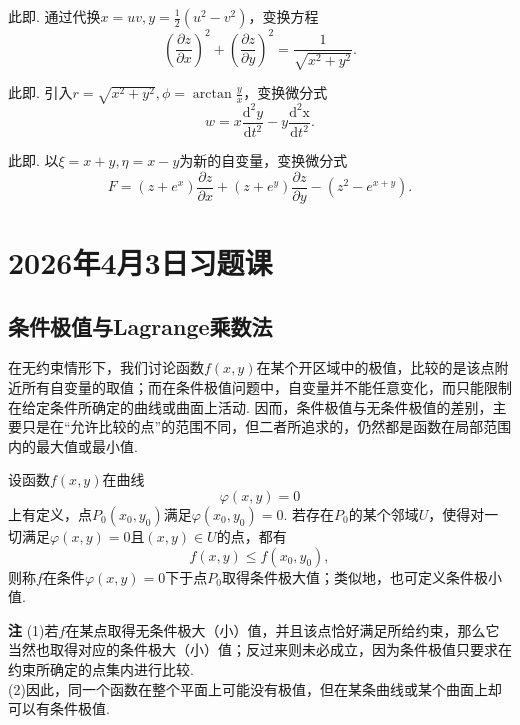 \documentclass{ctexart}
\newcounter{EnvironmentCounter}
\newcommand{\renewEnvironmentCounter}{\setcounter{EnvironmentCounter}{0}}
\newenvironment{custom}[1]{\par\noindent \textbf{#1}\quad}{\par\vspace{1em}}
\begin{document}
\begin{exercise}
此即\cite[例题20.3.2]{XHM}. 通过代换$x=uv,y=\frac{1}{2}(u^{2}-v^{2})$，变换方程
$$\left(\frac{\partial z}{\partial x}\right)^{2}+\left(\frac{\partial z}{\partial y}\right)^{2}=\frac{1}{\sqrt{x^{2}+y^{2}}}.$$
\end{exercise}

\begin{exercise}
此即\cite[20.3.3节练习题2]{XHM}. 引入$r=\sqrt{x^{2}+y^{2}},\phi=\arctan{\frac{y}{x}}$，变换微分式
$$w=x\frac{\mathrm{d}^{2}y}{\mathrm{d}t^{2}}-y\frac{\mathrm{d^{2}x}}{\mathrm{d}t^{2}}.$$
\end{exercise}

\begin{exercise}
此即\cite[20.3.3节练习题3]{XHM}. 以$\xi=x+y,\eta=x-y$为新的自变量，变换微分式
$$F=(z+e^{x})\frac{\partial z}{\partial x}+(z+e^{y})\frac{\partial z}{\partial y}-(z^{2}-e^{x+y}).$$
\end{exercise}


\clearpage
\renewEnvironmentCounter
\section{2026年4月3日习题课}
\subsection{条件极值与Lagrange乘数法}
在无约束情形下，我们讨论函数$f(x,y)$在某个开区域中的极值，比较的是该点附近所有自变量的取值；而在条件极值问题中，自变量并不能任意变化，而只能限制在给定条件所确定的曲线或曲面上活动. 因而，条件极值与无条件极值的差别，主要只是在“允许比较的点”的范围不同，但二者所追求的，仍然都是函数在局部范围内的最大值或最小值.

\begin{definition}
设函数$f(x,y)$在曲线
$$\varphi(x,y)=0$$
上有定义，点$P_{0}(x_{0},y_{0})$满足$\varphi(x_{0},y_{0})=0$. 若存在$P_{0}$的某个邻域$U$，使得对一切满足$\varphi(x,y)=0$且$(x,y)\in U$的点，都有
$$f(x,y)\leqslant f(x_{0},y_{0}),$$
则称$f$在条件$\varphi(x,y)=0$下于点$P_{0}$取得条件极大值；类似地，也可定义条件极小值.
\end{definition}

\begin{custom}{注}
(1)若$f$在某点取得无条件极大（小）值，并且该点恰好满足所给约束，那么它当然也取得对应的条件极大（小）值；反过来则未必成立，因为条件极值只要求在约束所确定的点集内进行比较.\\
(2)因此，同一个函数在整个平面上可能没有极值，但在某条曲线或某个曲面上却可以有条件极值.
\end{custom}
\end{document}
